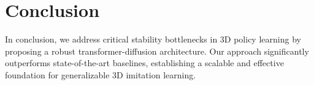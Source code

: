 \documentclass[runningheads]{llncs}
\begin{document}
\section{Conclusion}
In conclusion, we address critical stability bottlenecks in 3D policy learning by proposing a robust transformer-diffusion architecture. Our approach significantly outperforms state-of-the-art baselines, establishing a scalable and effective foundation for generalizable 3D imitation learning.
\clearpage

%
%


\end{document}
